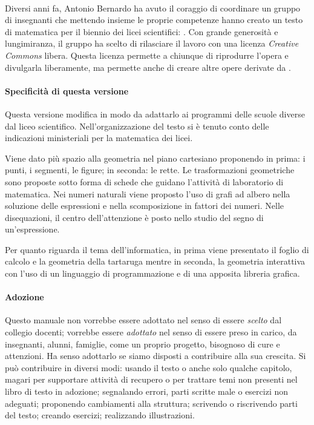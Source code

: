 \paragraph{\serie}
Diversi anni fa, Antonio Bernardo ha avuto il coraggio di coordinare un 
gruppo di insegnanti che mettendo insieme le proprie competenze hanno creato 
un testo di matematica per il biennio dei licei scientifici: \emph{\serie}.
Con grande generosità e lungimiranza, il gruppo ha scelto di rilasciare il
lavoro con una licenza \textit{Creative Commons} libera. 
Questa licenza permette 
a chiunque di riprodurre l'opera e divulgarla liberamente, ma permette anche 
di creare altre opere derivate da \emph{\serie}.

\paragraph{Specificità di questa versione} Questa versione modifica 
\emph{\serie} in modo da adattarlo ai programmi delle scuole diverse dal liceo 
scientifico. Nell'organizzazione del testo si è tenuto conto delle 
indicazioni ministeriali per la matematica dei licei.

Viene dato più spazio alla geometria nel piano cartesiano proponendo in 
prima: i punti, i segmenti, le figure; in seconda: le rette.
Le trasformazioni geometriche sono proposte sotto forma di schede 
che guidano l'attività di laboratorio di matematica.
Nei numeri naturali viene proposto l'uso di grafi ad albero nella soluzione 
delle espressioni e nella scomposizione in fattori dei numeri.
Nelle disequazioni, il centro dell'attenzione è posto nello studio
del segno di un'espressione.

Per quanto riguarda il tema dell'informatica, in prima viene presentato il  
foglio di calcolo e la geometria della tartaruga mentre 
in seconda, la geometria interattiva con l'uso di un linguaggio di 
programmazione e di una apposita libreria grafica. 

\paragraph{Adozione} Questo manuale non vorrebbe essere adottato nel 
senso di essere \emph{scelto} dal collegio docenti; vorrebbe essere 
\emph{adottato} nel senso di essere preso in carico, da insegnanti, alunni, 
famiglie, come un proprio progetto, bisognoso di cure e attenzioni.
Ha senso adottarlo se siamo disposti a contribuire alla sua crescita. 
Si può contribuire in diversi modi:
 usando il testo o anche solo qualche capitolo, magari per supportare 
 attività di recupero o per trattare temi non presenti nel libro di 
 testo in adozione;
 segnalando errori, parti scritte male o esercizi non adeguati;
 proponendo cambiamenti alla struttura;
 scrivendo o riscrivendo parti del testo;
 creando esercizi;
 realizzando illustrazioni.

